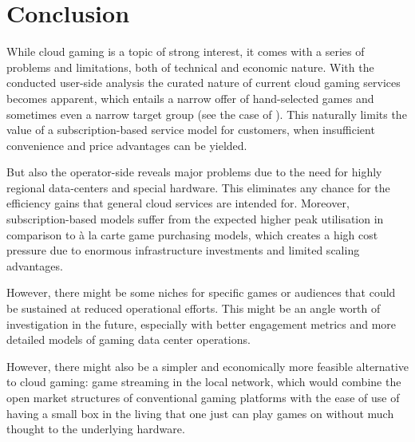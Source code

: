 \section{Conclusion}
\label{sec:conclusion}

While cloud gaming is a topic of strong interest, it comes with a series of problems and limitations, both of technical and economic nature. With the conducted user-side analysis the curated nature of current cloud gaming services becomes apparent, which entails a narrow offer of hand-selected games and sometimes even a narrow target group (see the case of \psnow). This naturally limits the value of a subscription-based service model for customers, when insufficient convenience and price advantages can be yielded. 


But also the operator-side reveals major problems due to the need for highly regional data-centers and special hardware. This eliminates any chance for the efficiency gains that general cloud services are intended for. Moreover, subscription-based models suffer from the expected higher peak utilisation in comparison to à la carte game purchasing models, which creates a high cost pressure due to enormous infrastructure investments and limited scaling advantages. 

However, there might be some niches for specific games or audiences that could be sustained at reduced operational efforts. This might be an angle worth of investigation in the future, especially with better engagement metrics and more detailed models of gaming data center operations.

However, there might also be a simpler and economically more feasible alternative to cloud gaming: game streaming in the local network, which would combine the open market structures of conventional gaming platforms with the ease of use of having a small box in the living that one just can play games on without much thought to the underlying hardware.